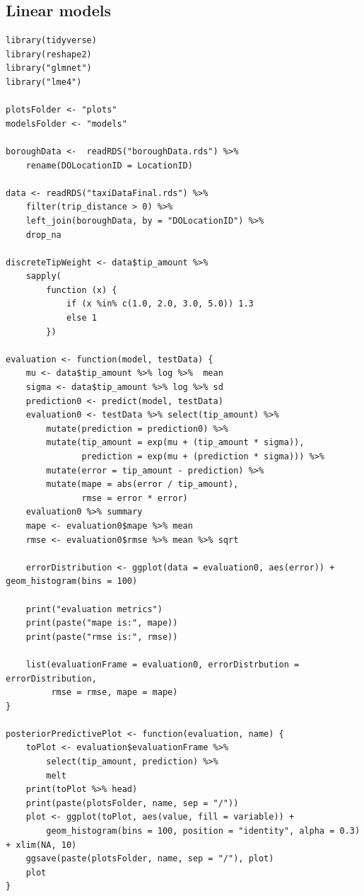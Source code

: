 \documentclass[11pt]{article}
\begin{document}
\subsection{Linear models}
\label{sec:org529f493}
\begin{verbatim}
library(tidyverse)
library(reshape2)
library("glmnet")
library("lme4")

plotsFolder <- "plots"
modelsFolder <- "models"

boroughData <-  readRDS("boroughData.rds") %>%
    rename(DOLocationID = LocationID)

data <- readRDS("taxiDataFinal.rds") %>%
    filter(trip_distance > 0) %>%
    left_join(boroughData, by = "DOLocationID") %>%
    drop_na

discreteTipWeight <- data$tip_amount %>%
    sapply(
        function (x) {
            if (x %in% c(1.0, 2.0, 3.0, 5.0)) 1.3
            else 1
        })

evaluation <- function(model, testData) {
    mu <- data$tip_amount %>% log %>%  mean
    sigma <- data$tip_amount %>% log %>% sd
    prediction0 <- predict(model, testData)
    evaluation0 <- testData %>% select(tip_amount) %>%
        mutate(prediction = prediction0) %>%
        mutate(tip_amount = exp(mu + (tip_amount * sigma)),
               prediction = exp(mu + (prediction * sigma))) %>%
        mutate(error = tip_amount - prediction) %>%
        mutate(mape = abs(error / tip_amount),
               rmse = error * error)
    evaluation0 %>% summary
    mape <- evaluation0$mape %>% mean
    rmse <- evaluation0$rmse %>% mean %>% sqrt

    errorDistribution <- ggplot(data = evaluation0, aes(error)) + geom_histogram(bins = 100)

    print("evaluation metrics")
    print(paste("mape is:", mape))
    print(paste("rmse is:", rmse))

    list(evaluationFrame = evaluation0, errorDistrbution = errorDistribution,
         rmse = rmse, mape = mape)
}

posteriorPredictivePlot <- function(evaluation, name) {
    toPlot <- evaluation$evaluationFrame %>%
        select(tip_amount, prediction) %>%
        melt
    print(toPlot %>% head)
    print(paste(plotsFolder, name, sep = "/"))
    plot <- ggplot(toPlot, aes(value, fill = variable)) +
        geom_histogram(bins = 100, position = "identity", alpha = 0.3) + xlim(NA, 10)
    ggsave(paste(plotsFolder, name, sep = "/"), plot)
    plot
}


\end{verbatim}
\end{document}
